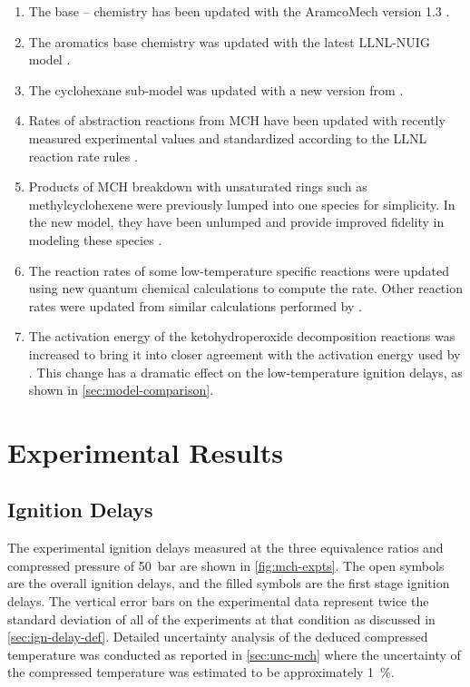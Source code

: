 \documentclass[../main.tex]{subfiles}
\begin{document}
\begin{enumerate}
    \item The base -- chemistry has been updated with the AramcoMech
        version 1.3 \cite{Metcalfe2013}.
    \item The aromatics base chemistry was updated with the latest LLNL-NUIG
        model \cite{Nakamura2014}.
    \item The cyclohexane sub-model was updated with a new version from
        \textcite{Silke2007}.
    \item Rates of abstraction reactions from MCH have been updated
        with recently measured experimental values \cite{Sivaramakrishnan2009}
        and standardized according to the LLNL reaction rate rules \cite{Sarathy2011b}.
    \item Products of MCH breakdown with unsaturated rings such as
        methylcyclohexene were previously lumped into one species for
        simplicity. In the new model, they have been unlumped and
        provide improved fidelity in modeling these species \cite{Pitz2013}.
    \item The reaction rates of some low-temperature specific reactions were
        updated using new quantum chemical calculations to compute the rate.
        Other reaction rates were updated from similar calculations performed
        by \textcite{Fernandes2009}.
    \item The activation energy of the ketohydroperoxide decomposition
        reactions was increased to bring it into closer agreement with
        the activation energy used by \textcite{Metcalfe2013}. This change
        has a dramatic effect on the low-temperature ignition delays, as shown
        in \cref{sec:model-comparison}.
\end{enumerate}

\section{Experimental Results}
\label{sec:mch-expts}

\subsection{Ignition Delays}
\label{sec:mch-ign-delays}

The experimental ignition delays measured at the three equivalence ratios and
compressed pressure of \SI{50}{\bar} are shown in \cref{fig:mch-expts}. The open symbols are the
overall ignition delays, and the filled symbols are the first stage ignition
delays. The vertical error bars on the experimental data represent twice the
standard deviation of all of the experiments at that condition as
discussed in \cref{sec:ign-delay-def}. Detailed uncertainty analysis of
the deduced compressed temperature was conducted as reported in
\cref{sec:unc-mch} where the uncertainty of the compressed
temperature was estimated to be approximately \SI{1}{\percent}.
\end{document}
